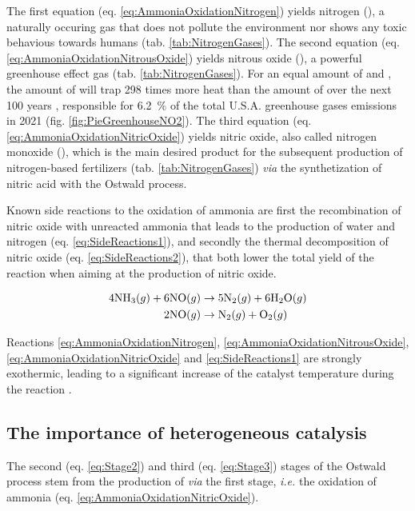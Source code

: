 The first equation (eq. \ref{eq:AmmoniaOxidationNitrogen}) yields nitrogen (\nitrogen), a naturally occuring gas that does not pollute the environment nor shows any toxic behavious towards humans (tab. \ref{tab:NitrogenGases}).
The second equation (eq. \ref{eq:AmmoniaOxidationNitrousOxide}) yields nitrous oxide (\nitrousoxide), a powerful greenhouse effect gas (tab. \ref{tab:NitrogenGases}).
For an equal amount of \nitrousoxide and \carbondioxide, the amount of \nitrousoxide will trap 298 times more heat than the amount of \carbondioxide over the next 100 years \parencite{MITCLIMATE}, responsible for \qty{6.2}{\percent} of the total U.S.A. greenhouse gases emissions in 2021 (fig. \ref{fig:PieGreenhouseNO2}).
The third equation (eq. \ref{eq:AmmoniaOxidationNitricOxide}) yields nitric oxide, also called nitrogen monoxide (\nitricoxide), which is the main desired product for the subsequent production of nitrogen-based fertilizers (tab. \ref{tab:NitrogenGases}) \textit{via} the synthetization of nitric acid with the Ostwald process.

Known side reactions to the oxidation of ammonia are first the recombination of nitric oxide with unreacted ammonia that leads to the production of water and nitrogen (eq. \ref{eq:SideReactions1}), and secondly the thermal decomposition of nitric oxide (eq. \ref{eq:SideReactions2}), that both lower the total yield of the reaction when aiming at the production of nitric oxide.

\begin{align}
    \label{eq:SideReactions1}
    4 \ammonia (g) + 6 \nitricoxide (g) & \rightarrow 5 \nitrogen (g) + 6 \water (g)\\
    \label{eq:SideReactions2}
    2 \nitricoxide (g) & \rightarrow \nitrogen (g) + \dioxygen (g)
\end{align}

Reactions \ref{eq:AmmoniaOxidationNitrogen}, \ref{eq:AmmoniaOxidationNitrousOxide}, \ref{eq:AmmoniaOxidationNitricOxide} and \ref{eq:SideReactions1} are strongly exothermic, leading to a significant increase of the catalyst temperature during the reaction \parencite{Hatscher2008}.


\subsection{The importance of heterogeneous catalysis}\label{sec:AmoOxiHC}

The second (eq. \ref{eq:Stage2}) and third (eq. \ref{eq:Stage3}) stages of the Ostwald process stem from the production of \nitricoxide \textit{via} the first stage, \textit{i.e.} the oxidation of ammonia (eq. \ref{eq:AmmoniaOxidationNitricOxide}).

